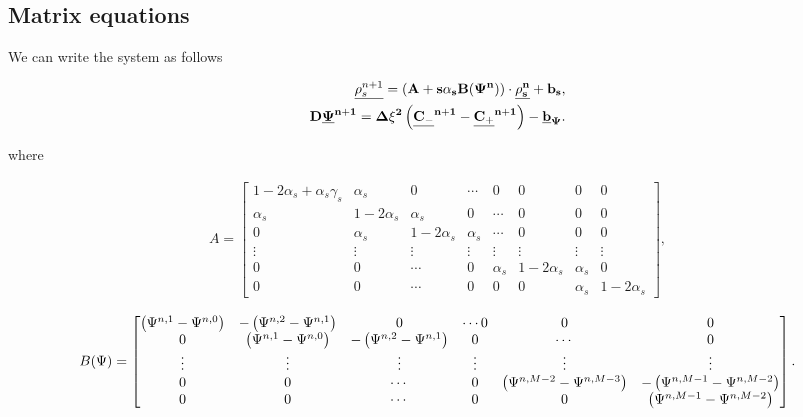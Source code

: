 \subsection{Matrix equations}

We can write the system as follows

\begin{align}
\underline{\rho_s^{n+1}} = (\bf{A} + s\alpha_s\bf{B}(\Psi^{n}) ) \cdot \underline{\rho_s^{n}} + \bf{b_s},\\
\bf{D} \underline{\Psi}^{n+1} = \Delta \xi ^2\left({\underline{C_-}^{n+1} - \underline{C_+}^{n+1}}\right)- \underline{b}_{\Psi}.
\end{align}


where

\begin{align}
A = \begin{bmatrix}
    1 - 2 \alpha_s + \alpha_s \gamma_s   &  \alpha_s   & 0  &   \cdots & 0   &   0   &   0   &   0 \\
    \alpha_s    &   1 - 2 \alpha_s       &  \alpha_s   & 0  & \cdots   & 0   &   0   &   0 \\
    0         & \alpha_s               &  1 - 2 \alpha_s  & \alpha_s   & \cdots   &   0   &   0   &   0 \\
    \vdots    &  \vdots              &\vdots          &  \vdots  & \vdots   &\vdots & \vdots & \vdots \\ 
    0         &  0                   &  \cdots        &  0       &  \alpha_s    &  1-2\alpha_s &    \alpha_s   &    0 \\
0         &  0                   &  \cdots        &  0           &  0         &     0      &  \alpha_s    &  1-2\alpha_s 
\end{bmatrix},
\end{align}


\begin{align}
B(\Psi) = \begin{bmatrix}
    \left({\Psi^{n,1} - \Psi^{n, 0}}\right)   &  -\left({\Psi^{n,2} - \Psi^{n, 1}}\right)   & 0  &   \cdots   0   &   0   &   0 \\
    0                                &  \left({\Psi^{n,1} - \Psi^{n, 0}}\right)    & -\left({\Psi^{n,2} - \Psi^{n, 1}}\right)   & 0  & \cdots    &   0 \\
    \vdots    &  \vdots              &\vdots           &\vdots & \vdots & \vdots \\ 
    0         &  0                   &  \cdots        &  0              & \left({\Psi^{n,M-2} - \Psi^{n, M-3}}\right)   & -\left({\Psi^{n,M-1} - \Psi^{n, M-2}}\right) \\
0         &  0                   &  \cdots              &     0      &  0    &  \left({\Psi^{n,M-1} - \Psi^{n, M-2}}\right)
\end{bmatrix}.
\end{align}

